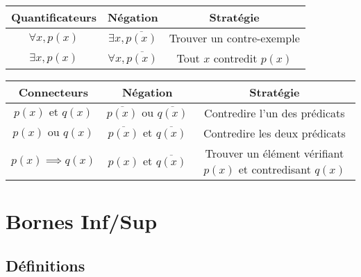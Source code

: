 \documentclass[a4paper,10pt]{article}
\begin{document}
\begin{table}[h!]
\centering
\renewcommand{\arraystretch}{1.5} %
\begin{tabular}{|c|c|c|}
\hline
\textbf{Quantificateurs} & \textbf{Négation} & \textbf{Stratégie} \\
\hline
$\forall x, p(x)$ & $\exists x, \overline{p(x)}$ & Trouver un contre-exemple \\
\hline
$\exists x, p(x)$ & $\forall x, \overline{p(x)}$ & Tout $x$ contredit $p(x)$ \\
\hline
\end{tabular}

\vspace{1em} %

\begin{tabular}{|c|c|c|}
\hline
\textbf{Connecteurs} & \textbf{Négation} & \textbf{Stratégie} \\
\hline
$p(x) \text{ et } q(x)$ & $\overline{p(x)} \text{ ou } \overline{q(x)}$ & Contredire l’un des prédicats \\
\hline
$p(x) \text{ ou } q(x)$ & $\overline{p(x)} \text{ et } \overline{q(x)}$ & Contredire les deux prédicats \\
\hline
$p(x) \implies q(x)$ & $p(x) \text{ et } \overline{q(x)}$ & Trouver un élément vérifiant $p(x)$ et contredisant $q(x)$ \\
\hline
\end{tabular}
\end{table}



\section*{Bornes Inf/Sup}

\subsection*{Définitions}
\end{document}
